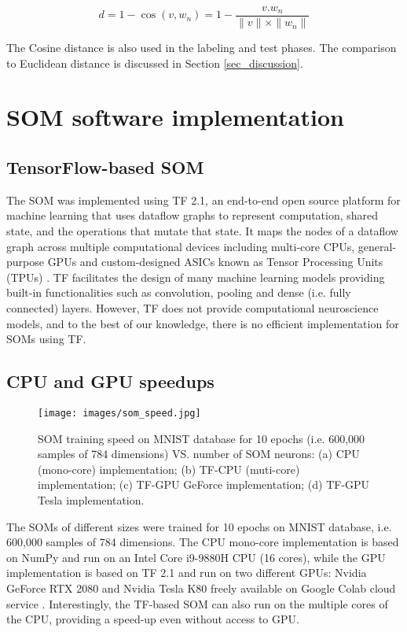 \documentclass[runningheads]{llncs}
\begin{document}
\begin{equation}
\label{eq_cos-dist}
d = 1 - \cos(v, w_n) = 1 - \frac{v . w_n}{\|v\| \times \|w_n\|}
\end{equation}

The Cosine distance is also used in the labeling and test phases. The comparison to Euclidean distance is discussed in Section \ref{sec_discussion}.



\section{SOM software implementation}
\label{sec_tf-som}

\subsection{TensorFlow-based SOM}
The SOM was implemented using TF \cite{abadi2016tensorflow} 2.1, an end-to-end open source platform for machine learning that uses dataflow graphs to represent computation, shared state, and the operations that mutate that state. It maps the nodes of a dataflow graph across multiple computational devices including multi-core CPUs, general-purpose GPUs and custom-designed ASICs known as Tensor Processing Units (TPUs) \cite{abadi2016tensorflow}. TF facilitates the design of many machine learning models providing built-in functionalities such as convolution, pooling and dense (i.e. fully connected) layers.
However, TF does not provide computational neuroscience models, and to the best of our knowledge, there is no efficient implementation for SOMs using TF.


\subsection{CPU and GPU speedups}

\begin{figure}[ht]
	\centerline{\texttt{[image: images/som\_speed.jpg]}}
	\caption{SOM training speed on MNIST database for 10 epochs (i.e. 600,000 samples of 784 dimensions) VS. number of SOM neurons: (a) CPU (mono-core) implementation; (b) TF-CPU (muti-core) implementation; (c) TF-GPU GeForce implementation; (d) TF-GPU Tesla implementation.}
	\label{fig_som-speed}
\end{figure}

The SOMs of different sizes were trained for 10 epochs on MNIST database, i.e. 600,000 samples of 784 dimensions. The CPU mono-core implementation is based on NumPy \cite{vanderwalt2011numpy} and run on an Intel Core i9-9880H CPU (16 cores), while the GPU implementation is based on TF 2.1 \cite{abadi2016tensorflow} and run on two different GPUs: Nvidia GeForce RTX 2080 and Nvidia Tesla K80 freely available on Google Colab cloud service \cite{carneiro2018colab}. Interestingly, the TF-based SOM can also run on the multiple cores of the CPU, providing a speed-up even without access to GPU.
\end{document}
